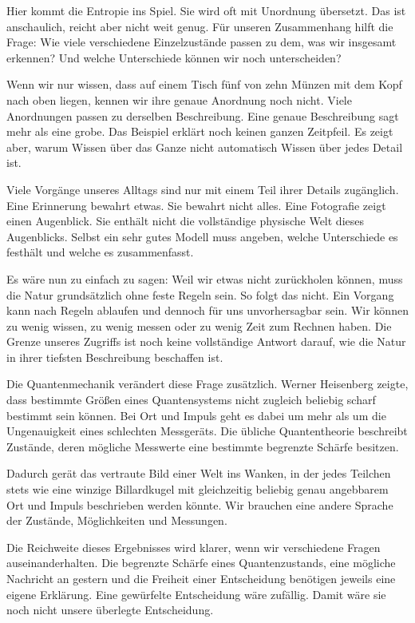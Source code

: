 Hier kommt die Entropie ins Spiel. Sie wird oft mit Unordnung übersetzt. Das ist anschaulich, reicht aber nicht weit genug. Für unseren Zusammenhang hilft die Frage: Wie viele verschiedene Einzelzustände passen zu dem, was wir insgesamt erkennen? Und welche Unterschiede können wir noch unterscheiden?

Wenn wir nur wissen, dass auf einem Tisch fünf von zehn Münzen mit dem Kopf nach oben liegen, kennen wir ihre genaue Anordnung noch nicht. Viele Anordnungen passen zu derselben Beschreibung. Eine genaue Beschreibung sagt mehr als eine grobe. Das Beispiel erklärt noch keinen ganzen Zeitpfeil. Es zeigt aber, warum Wissen über das Ganze nicht automatisch Wissen über jedes Detail ist.

Viele Vorgänge unseres Alltags sind nur mit einem Teil ihrer Details zugänglich. Eine Erinnerung bewahrt etwas. Sie bewahrt nicht alles. Eine Fotografie zeigt einen Augenblick. Sie enthält nicht die vollständige physische Welt dieses Augenblicks. Selbst ein sehr gutes Modell muss angeben, welche Unterschiede es festhält und welche es zusammenfasst.

Es wäre nun zu einfach zu sagen: Weil wir etwas nicht zurückholen können, muss die Natur grundsätzlich ohne feste Regeln sein. So folgt das nicht. Ein Vorgang kann nach Regeln ablaufen und dennoch für uns unvorhersagbar sein. Wir können zu wenig wissen, zu wenig messen oder zu wenig Zeit zum Rechnen haben. Die Grenze unseres Zugriffs ist noch keine vollständige Antwort darauf, wie die Natur in ihrer tiefsten Beschreibung beschaffen ist.

Die Quantenmechanik verändert diese Frage zusätzlich. Werner Heisenberg zeigte, dass bestimmte Größen eines Quantensystems nicht zugleich beliebig scharf bestimmt sein können. Bei Ort und Impuls geht es dabei um mehr als um die Ungenauigkeit eines schlechten Messgeräts. Die übliche Quantentheorie beschreibt Zustände, deren mögliche Messwerte eine bestimmte begrenzte Schärfe besitzen.

Dadurch gerät das vertraute Bild einer Welt ins Wanken, in der jedes Teilchen stets wie eine winzige Billardkugel mit gleichzeitig beliebig genau angebbarem Ort und Impuls beschrieben werden könnte. Wir brauchen eine andere Sprache der Zustände, Möglichkeiten und Messungen.

Die Reichweite dieses Ergebnisses wird klarer, wenn wir verschiedene Fragen auseinanderhalten. Die begrenzte Schärfe eines Quantenzustands, eine mögliche Nachricht an gestern und die Freiheit einer Entscheidung benötigen jeweils eine eigene Erklärung. Eine gewürfelte Entscheidung wäre zufällig. Damit wäre sie noch nicht unsere überlegte Entscheidung.

